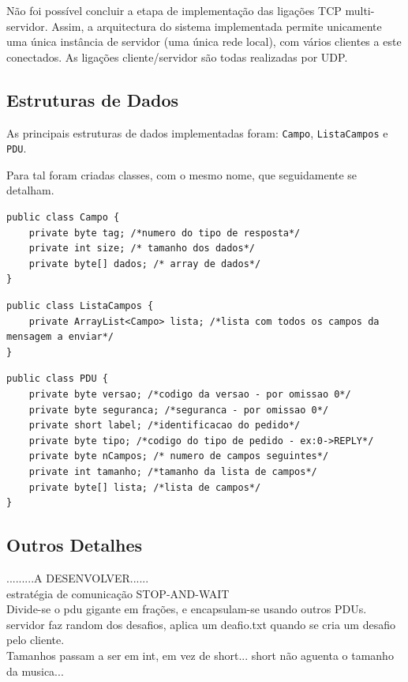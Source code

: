 \documentclass{llncs}
\begin{document}
Não foi possível concluir a etapa de implementação das ligações TCP multi-servidor. 
Assim, a arquitectura do sistema implementada permite unicamente uma única instância de 
servidor (uma única rede local), com vários clientes a este conectados. As ligações 
cliente/servidor são todas realizadas por UDP.

\subsection{Estruturas de Dados}
As principais estruturas de dados implementadas foram: \verb!Campo!, \verb!ListaCampos! e
\verb!PDU!.

Para tal foram criadas classes, com o mesmo nome, que seguidamente se detalham.

\begin{lstlisting}[caption={Classe Campo}, label={code:campo}]
public class Campo {
    private byte tag; /*numero do tipo de resposta*/ 
    private int size; /* tamanho dos dados*/
    private byte[] dados; /* array de dados*/
}
\end{lstlisting}

\begin{lstlisting}[caption={Classe ListaCampos}, label={code:ListaCampos}]
public class ListaCampos {
    private ArrayList<Campo> lista; /*lista com todos os campos da mensagem a enviar*/
}
\end{lstlisting}

\begin{lstlisting}[caption={Classe PDU}, label={code:PDU}]
public class PDU {
    private byte versao; /*codigo da versao - por omissao 0*/
    private byte seguranca; /*seguranca - por omissao 0*/
    private short label; /*identificacao do pedido*/
    private byte tipo; /*codigo do tipo de pedido - ex:0->REPLY*/
    private byte nCampos; /* numero de campos seguintes*/
    private int tamanho; /*tamanho da lista de campos*/
    private byte[] lista; /*lista de campos*/
}
\end{lstlisting}


\subsection{Outros Detalhes}
.........A DESENVOLVER......\\
estratégia de comunicação STOP-AND-WAIT\\
Divide-se o pdu gigante em frações, e encapsulam-se usando outros PDUs.\\
servidor faz random dos desafios, aplica um deafio.txt quando se cria um desafio pelo cliente.\\
Tamanhos passam a ser em int, em vez de short... short não aguenta o tamanho da musica...
\end{document}
